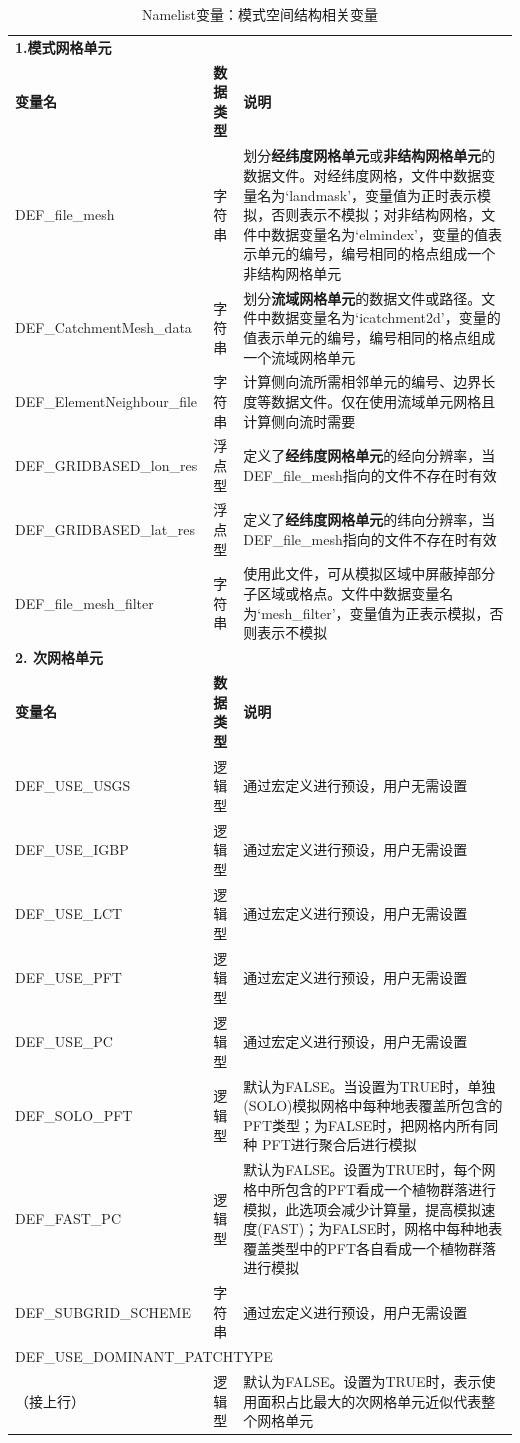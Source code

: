 \documentclass[a4paper,12pt,twoside]{article}
\begin{document}
\begin{table}[!htbp] \small
\caption{Namelist变量：模式空间结构相关变量} \label{table_nl_structure}
\centering \renewcommand{\arraystretch}{1.2}
\begin{tabular}{lcp{}}
\toprule
\textbf{1.模式网格单元} && \\
\textbf{变量名} & \textbf{数据类型} & \textbf{说明} \\DEF\_file\_mesh & 字符串 & 划分\textbf{经纬度网格单元}或\textbf{非结构网格单元}的数据文件。对经纬度网格，文件中数据变量名为`landmask'，变量值为正时表示模拟，否则表示不模拟；对非结构网格，文件中数据变量名为`elmindex'，变量的值表示单元的编号，编号相同的格点组成一个非结构网格单元 \\
DEF\_CatchmentMesh\_data & 字符串 & 划分\textbf{流域网格单元}的数据文件或路径。文件中数据变量名为`icatchment2d'，变量的值表示单元的编号，编号相同的格点组成一个流域网格单元 \\
DEF\_ElementNeighbour\_file & 字符串 & 计算侧向流所需相邻单元的编号、边界长度等数据文件。仅在使用流域单元网格且计算侧向流时需要 \\
DEF\_GRIDBASED\_lon\_res & 浮点型 & 定义了\textbf{经纬度网格单元}的经向分辨率，当DEF\_file\_mesh指向的文件不存在时有效 \\
DEF\_GRIDBASED\_lat\_res & 浮点型 & 定义了\textbf{经纬度网格单元}的纬向分辨率，当DEF\_file\_mesh指向的文件不存在时有效 \\
DEF\_file\_mesh\_filter & 字符串 & 使用此文件，可从模拟区域中屏蔽掉部分子区域或格点。文件中数据变量名为`mesh\_filter'，变量值为正表示模拟，否则表示不模拟 \\
\midrule
\textbf{2. 次网格单元} & & \\ 
\textbf{变量名} & \textbf{数据类型} & \textbf{说明} \\
DEF\_USE\_USGS & 逻辑型 & 通过宏定义进行预设，用户无需设置\\
DEF\_USE\_IGBP & 逻辑型 & 通过宏定义进行预设，用户无需设置\\
DEF\_USE\_LCT & 逻辑型 & 通过宏定义进行预设，用户无需设置\\
DEF\_USE\_PFT & 逻辑型 & 通过宏定义进行预设，用户无需设置\\
DEF\_USE\_PC & 逻辑型 & 通过宏定义进行预设，用户无需设置\\
DEF\_SOLO\_PFT & 逻辑型 & 默认为FALSE。当设置为TRUE时，单独(SOLO)模拟网格中每种地表覆盖所包含的PFT类型；为FALSE时，把网格内所有同种 PFT进行聚合后进行模拟\\
DEF\_FAST\_PC & 逻辑型 & 默认为FALSE。设置为TRUE时，每个网格中所包含的PFT看成一个植物群落进行模拟，此选项会减少计算量，提高模拟速度(FAST)；为FALSE时，网格中每种地表覆盖类型中的PFT各自看成一个植物群落进行模拟\\
DEF\_SUBGRID\_SCHEME & 字符串 & 通过宏定义进行预设，用户无需设置 \\
\multicolumn{3}{l}{DEF\_USE\_DOMINANT\_PATCHTYPE} \\
（接上行）& 逻辑型 & 默认为FALSE。设置为TRUE时，表示使用面积占比最大的次网格单元近似代表整个网格单元\\
\bottomrule
\end{tabular} 
\end{table}
\end{document}
